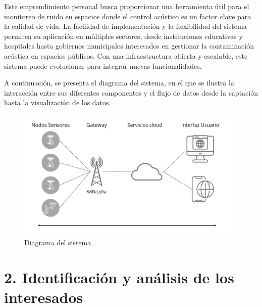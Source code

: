 \documentclass[
11pt, %
]{charter}
\begin{document}
 Este emprendimiento personal busca proporcionar una herramienta útil para el monitoreo de ruido en espacios donde el control 
 acústico es un factor clave para la calidad de vida. La facilidad de implementación y la flexibilidad del sistema permiten 
 su aplicación en múltiples sectores, desde instituciones educativas y hospitales hasta gobiernos municipales interesados en 
 gestionar la contaminación acústica en espacios públicos. Con una infraestructura abierta y escalable, este sistema puede 
 evolucionar para integrar nuevas funcionalidades.

 A continuación, se presenta el diagrama del sistema, en el que se ilustra la interacción entre sus diferentes componentes y el 
 flujo de datos desde la captación hasta la visualización de los datos.


\begin{figure}[htpb]
	\centering 
	\includegraphics[width=.75\textwidth]{./Figuras/diagramaSist.png}
	\caption{Diagrama del sistema.}
	\label{fig:diagBloques}
	\end{figure}
	
	\vspace{25px}

\section{2. Identificación y análisis de los interesados}
\label{sec:interesados}
\end{document}
